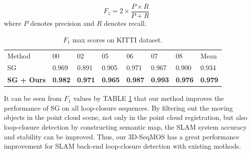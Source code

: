 \documentclass[lettersize,journal]{IEEEtran}
\begin{document}
\begin{equation}
    F_1 = 2 \times \frac{P\times R}{P+R}
\end{equation}
where $P$ denotes precision and $R$ denotes recall.

\setlength{\tabcolsep}{4pt}
\begin{table}[h]
\begin{center}
\caption{$F_1$ max scores on KITTI dataset.}
\label{table:4}
\begin{tabular}{llllllll}
\hline\noalign{\smallskip}
{\upshape Method} & 00 & 02 & 05 & 06 & 07 & 08 & {\upshape Mean}\\
\noalign{\smallskip}
\hline
\noalign{\smallskip}
SG &	0.969 &	0.891 &	0.905 &	0.971 &	0.967 &	0.900 &	0.934 \\
\textbf{{\upshape SG + Ours}} &	\textbf{0.982} & \textbf{0.971} &	\textbf{0.965} &	\textbf{0.987} &	\textbf{0.993}	 & \textbf{0.976} &	\textbf{0.979} \\
\hline
\end{tabular}
\end{center}
\end{table}
\setlength{\tabcolsep}{1.4pt}

It can be seen from $F_1$ values by TABLE \ref{table:4}  that our method improves the performance of SG on all loop-closure sequences. By filtering out the moving objects in the point cloud scene, not only in the point cloud registration, but also loop-closure detection by constructing semantic map, the SLAM system accuracy and stability can be improved. Thus, our 3D-SeqMOS has a great performance improvement for SLAM back-end loop-closure detection with existing mothods.
\end{document}
